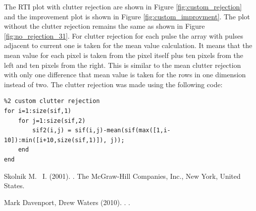 \documentclass{article}
\begin{document}
The RTI plot with clutter rejection are shown in Figure \ref{fig:custom_rejection} and the improvement plot is shown in Figure \ref{fig:custom_improvment}. The plot without the clutter rejection remains the same as shown in Figure \ref{fig:no_rejection_31}. For clutter rejection for each pulse the array with pulses adjacent to current one is taken for the mean value calculation. It means that the mean value for each pixel is taken from the pixel itself plus ten pixels from the left and ten pixels from the right. This is similar to the mean clutter rejection with only one difference that mean value is taken for the rows in one dimension instead of two. The clutter rejection was made using the following code:

\begin{lstlisting}
%2 custom clutter rejection
for i=1:size(sif,1)
    for j=1:size(sif,2)
        sif2(i,j) = sif(i,j)-mean(sif(max([1,i-10]):min([i+10,size(sif,1)]), j));
    end
end
\end{lstlisting}


\newpage
\begin{thebibliography}{9}

Skolnik M. ~I.  (2001).
.
\newblock The McGraw-Hill Companies, Inc., New York, United States.

Mark Davenport, Drew Waters (2010).
.
.

\end{thebibliography}
\end{document}
